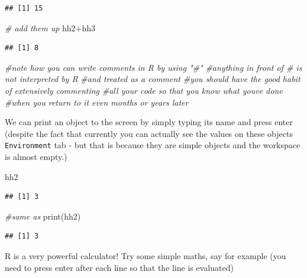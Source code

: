 \documentclass[
]{article}
\newenvironment{Shaded}{\begin{snugshade}}{\end{snugshade}}
\newcommand{\CommentTok}[1]{\textcolor[rgb]{0.56,0.35,0.01}{\textit{#1}}}
\newcommand{\FunctionTok}[1]{\textcolor[rgb]{0.00,0.00,0.00}{#1}}
\newcommand{\NormalTok}[1]{#1}
\newcommand{\SpecialCharTok}[1]{\textcolor[rgb]{0.00,0.00,0.00}{#1}}
\begin{document}
\begin{verbatim}
## [1] 15
\end{verbatim}

\begin{Shaded}
\begin{Highlighting}[]
\CommentTok{\# add them up}
\NormalTok{hh2}\SpecialCharTok{+}\NormalTok{hh3}
\end{Highlighting}
\end{Shaded}

\begin{verbatim}
## [1] 8
\end{verbatim}

\begin{Shaded}
\begin{Highlighting}[]
\CommentTok{\#note how you can write comments in R by using "\#"}
\CommentTok{\#anything in front of \# is not interpreted by R}
\CommentTok{\#and treated as a comment}
\CommentTok{\#you should have the good habit of extensively commenting}
\CommentTok{\#all your code so that you know what you\textquotesingle{}ve done}
\CommentTok{\#when you return to it even months or years later}
\end{Highlighting}
\end{Shaded}

We can print an object to the screen by simply typing its name and press
enter (despite the fact that currently you can actually see the values
on these objects \texttt{Environment} tab - but that is because they are
simple objects and the workspace is almost empty.)

\begin{Shaded}
\begin{Highlighting}[]
\NormalTok{hh2}
\end{Highlighting}
\end{Shaded}

\begin{verbatim}
## [1] 3
\end{verbatim}

\begin{Shaded}
\begin{Highlighting}[]
\CommentTok{\#same as }
\FunctionTok{print}\NormalTok{(hh2)}
\end{Highlighting}
\end{Shaded}

\begin{verbatim}
## [1] 3
\end{verbatim}

R is a very powerful calculator! Try some simple maths, say for example
(you need to press enter after each line so that the line is evaluated)
\end{document}

